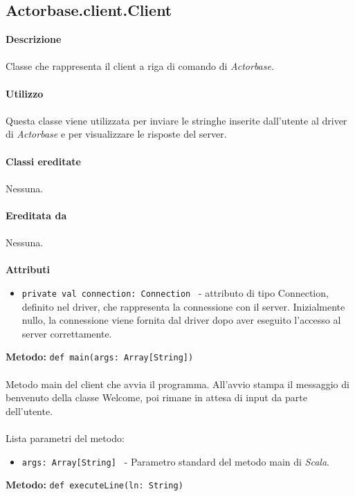 \documentclass[a4paper]{article}
\begin{document}
	\subsection{Actorbase.client.Client}	
		\textbf{Descrizione}
			\\ \\
			Classe che rappresenta il client a riga di comando di \emph{Actorbase}.
			\\ \\
		\textbf{Utilizzo}
			\\ \\
			Questa classe viene utilizzata per inviare le stringhe inserite dall'utente al driver di \emph{Actorbase} e per visualizzare le risposte del server.
			\\ \\
		\textbf{Classi ereditate}
			\\ \\
			Nessuna.
			\\ \\
		\textbf{Ereditata da}
			\\ \\
			Nessuna.
			\\ \\
		\textbf{Attributi}
			\begin{itemize}
				\item \texttt{private val connection: Connection } - attributo di tipo Connection, definito nel driver, che rappresenta la connessione con il server. Inizialmente nullo, la connessione viene fornita dal driver dopo aver eseguito l'accesso al server correttamente.
			\end{itemize}
			\textbf{Metodo: }\texttt{def main(args: Array[String])}
			\\ \\
			Metodo main del client che avvia il programma. All'avvio stampa il messaggio di benvenuto della classe Welcome, poi rimane in attesa di input da parte dell'utente.
			\\ \\
			Lista parametri del metodo:
			\begin{itemize}
				\item \texttt{args: Array[String] } - Parametro standard del metodo main di \emph{Scala}.
			\end{itemize}
			\textbf{Metodo: }\texttt{def executeLine(ln: String)}
			\\ \\
\end{document}
